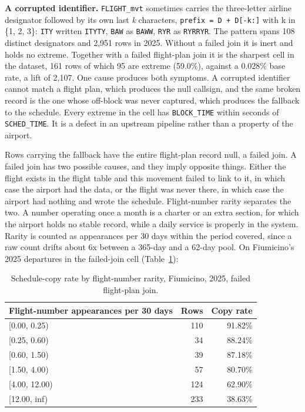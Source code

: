 \documentclass[
  manuscript=article,
  layout=preprint,
  year=2026,
  volume=x,
]{extra/joas}
\begin{document}
\textbf{A corrupted identifier.} \texttt{FLIGHT\_mvt} sometimes carries the three-letter airline designator followed by its own last \emph{k} characters, \texttt{prefix\ =\ D\ +\ D{[}-k:{]}} with k in \{1, 2, 3\}: \texttt{ITY} written \texttt{ITYTY}, \texttt{BAW} as \texttt{BAWW}, \texttt{RYR} as \texttt{RYRRYR}. The pattern spans 108 distinct designators and 2,951 rows in 2025. Without a failed join it is inert and holds no extreme. Together with a failed flight-plan join it is the sharpest cell in the dataset, 161 rows of which 95 are extreme (59.0\%), against a 0.028\% base rate, a lift of 2,107. One cause produces both symptoms. A corrupted identifier cannot match a flight plan, which produces the null callsign, and the same broken record is the one whose off-block was never captured, which produces the fallback to the schedule. Every extreme in the cell has \texttt{BLOCK\_TIME} within seconds of \texttt{SCHED\_TIME}. It is a defect in an upstream pipeline rather than a property of the airport.

Rows carrying the fallback have the entire flight-plan record null, a failed join. A failed join has two possible causes, and they imply opposite things. Either the flight exists in the flight table and this movement failed to link to it, in which case the airport had the data, or the flight was never there, in which case the airport had nothing and wrote the schedule. Flight-number rarity separates the two. A number operating once a month is a charter or an extra section, for which the airport holds no stable record, while a daily service is properly in the system. Rarity is counted as appearances per 30 days within the period covered, since a raw count drifts about 6x between a 365-day and a 62-day pool. On Fiumicino's 2025 departures in the failed-join cell (Table~\ref{tab:6}):

\begin{table}[htbp!]
  \centering
  \small
  \setlength{\tabcolsep}{5pt}\renewcommand{\arraystretch}{1.15}
  \caption{Schedule-copy rate by flight-number rarity, Fiumicino, 2025, failed flight-plan join.}
  \label{tab:6}
  \begin{tabular*}{\linewidth}{@{\extracolsep{\fill}}lrr}
  \toprule
  \textbf{Flight-number appearances per 30 days} & \textbf{Rows} & \textbf{Copy rate} \\
  \midrule
  {[}0.00, 0.25) & 110 & 91.82\% \\
  {[}0.25, 0.60) & 34 & 88.24\% \\
  {[}0.60, 1.50) & 39 & 87.18\% \\
  {[}1.50, 4.00) & 57 & 80.70\% \\
  {[}4.00, 12.00) & 124 & 62.90\% \\
  {[}12.00, inf) & 233 & 38.63\% \\
  \bottomrule
  \end{tabular*}
\end{table}
\end{document}
